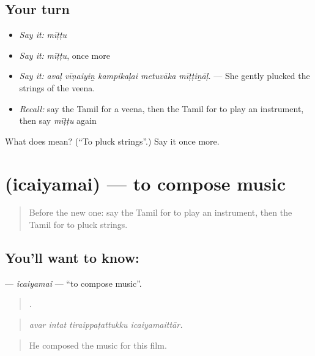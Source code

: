 \subsection*{Your turn}
\begin{itemize}
\raggedright
  \item \emph{Say it:} \emph{mīṭṭu}
  \item \emph{Say it:} \emph{mīṭṭu}, once more
  \item \emph{Say it:} \emph{avaḷ vīṇaiyiṉ kampikaḷai metuvāka mīṭṭiṉāḷ.} — She gently plucked the strings of the veena.
  \item \emph{Recall:} say the Tamil for a veena, then the Tamil for to play an instrument, then say \emph{mīṭṭu} again
\end{itemize}

\begin{tcolorbox}[breakable,colback=teal!4,colframe=teal!35!black,title={Before you move on}]
What does  mean? (\textquotedblleft{}To pluck strings\textquotedblright{}.) Say it once more.
\end{tcolorbox}
\section[\texorpdfstring{\ta{இசையமை} (icaiyamai)}{இசையமை (icaiyamai)}]{ (icaiyamai) — to compose music}

\label{lesson:TA-C539-icaiyamai}



\begin{quote}
Before the new one: say the Tamil for to play an instrument, then the Tamil for to pluck strings.
\end{quote}

\subsection*{You'll want to know: }
\textbf{} — \emph{icaiyamai} — \textquotedblleft{}to compose music\textquotedblright{}.

\begin{quote}
   .
\end{quote}

\begin{quote}
\emph{avar intat tiraippaṭattukku icaiyamaittār.}
\end{quote}

\begin{quote}
He composed the music for this film.
\end{quote}

